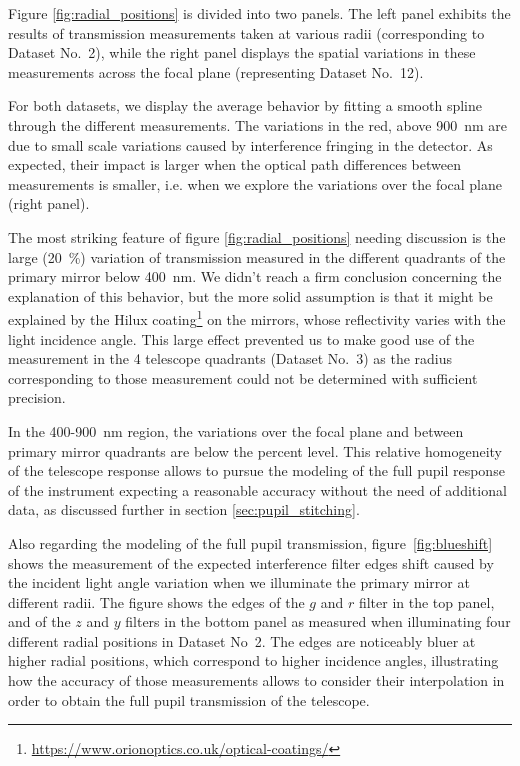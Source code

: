 Figure \ref{fig:radial_positions} is divided into two panels. The left panel exhibits the results of transmission measurements taken at various radii (corresponding to Dataset No.~2), while the right panel displays the spatial variations in these measurements across the focal plane (representing Dataset No.~12).

For both datasets, we display the average behavior by fitting a smooth spline through the different measurements. The variations in the red, above \SI{900}{\nano\meter} are due to small scale variations caused by interference fringing in the detector. As expected, their impact is larger when the optical path differences between measurements is smaller, i.e. when we explore the variations over the focal plane (right panel).

The most striking feature of figure \ref{fig:radial_positions} needing discussion is the large (\SI{20}{\%}) variation of transmission measured in the different quadrants of the primary mirror below \SI{400}{\nano\meter}. We didn't reach a firm conclusion concerning the explanation of this behavior, but the more solid assumption is that it might be explained by the Hilux coating\footnote{\url{https://www.orionoptics.co.uk/optical-coatings/}} on the \SD mirrors, whose reflectivity varies with the light incidence angle. This large effect prevented us to make good use of the measurement in the 4 telescope quadrants (Dataset No.~3) as the radius corresponding to those measurement could not be determined with sufficient precision.

In the 400-\SI{900}{\nano\meter} region, the variations over the focal plane and
between primary mirror quadrants are below the percent level. This relative
homogeneity of the telescope response allows to pursue the modeling of the full
pupil response of the instrument expecting a reasonable accuracy without the
need of additional data, as discussed further in section
\ref{sec:pupil_stitching}.

Also regarding the modeling of the full pupil transmission,
figure~\ref{fig:blueshift} shows the measurement of the expected interference
filter edges shift caused by the incident light angle variation when we
illuminate the primary mirror at different radii. The figure shows the edges of
the $g$ and $r$ filter in the top panel, and of the $z$ and $y$ filters in the
bottom panel as measured when illuminating four different radial positions in
Dataset No~2. The edges are noticeably bluer at higher radial positions, which
correspond to higher incidence angles, illustrating how the accuracy of those
measurements allows to consider their interpolation in order to obtain the full
pupil transmission of the telescope.



